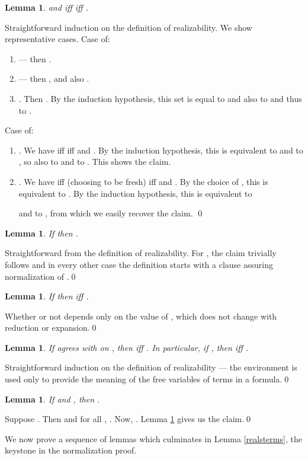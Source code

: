 \documentclass{LMCS}
\newtheorem{lemma}[thm]{Lemma}
\begin{document}
\begin{lemma}\label{realsubst}
 and  iff  iff .
\end{lemma}
\proof Straightforward induction on the definition of realizability. We show representative
cases. Case  of:
\begin{enumerate}[]
\item  --- then . 
\item  --- then ,  and also .
\item . Then . By the induction
hypothesis, this set is equal to 
and also to 
 and thus to 
. 
\end{enumerate}
Case  of:
\begin{enumerate}[]
\item . We have  iff  iff  and . By
the induction hypothesis, this is equivalent to  and to
, so
also to  and to . This shows the claim.
\item . We have  iff
(choosing  to be fresh)  iff  and . By the choice of , this is equivalent to
. By the induction hypothesis, this is equivalent to

and to , from which we easily recover the claim. \qed
\end{enumerate}

\begin{lemma}\label{realnorm}
If  then .
\end{lemma}
\proof Straightforward from the definition of realizability. For ,
the claim trivially follows and in every other case the definition starts with a clause assuring normalization of .\qed

\begin{lemma}\label{realredclosed}
If  then  iff .
\end{lemma}
\proof Whether  or not depends only on the value of , which does not
change with reduction or expansion.\qed


\begin{lemma}\label{afvreal}
If  agrees with  on , then  iff . In particular, if , then  iff . 
\end{lemma}
\proof Straightforward induction on the definition of realizability --- the environment
is used only to provide the meaning of the free variables of terms in a
formula.\qed


\begin{lemma}\label{realimpl}
If  and , then . 
\end{lemma}
\proof Suppose . Then 
and for all , . Now, . Lemma \ref{realredclosed} gives us the claim.\qed


We now prove a sequence of lemmas which culminates in Lemma
\ref{realsterms}, the keystone in the normalization proof. 
\end{document}
